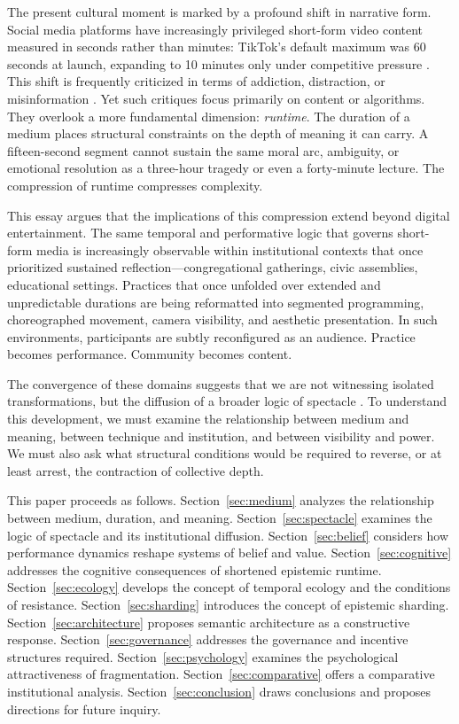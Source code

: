\documentclass[12pt]{article}
\begin{document}
The present cultural moment is marked by a profound shift in narrative form. Social media platforms have increasingly privileged short-form video content measured in seconds rather than minutes: TikTok's default maximum was 60 seconds at launch, expanding to 10 minutes only under competitive pressure \citep{Herrman2019}. This shift is frequently criticized in terms of addiction, distraction, or misinformation \citep{Twenge2017,Haidt2023}. Yet such critiques focus primarily on content or algorithms. They overlook a more fundamental dimension: \emph{runtime}. The duration of a medium places structural constraints on the depth of meaning it can carry. A fifteen-second segment cannot sustain the same moral arc, ambiguity, or emotional resolution as a three-hour tragedy or even a forty-minute lecture. The compression of runtime compresses complexity.

This essay argues that the implications of this compression extend beyond digital entertainment. The same temporal and performative logic that governs short-form media is increasingly observable within institutional contexts that once prioritized sustained reflection---congregational gatherings, civic assemblies, educational settings. Practices that once unfolded over extended and unpredictable durations are being reformatted into segmented programming, choreographed movement, camera visibility, and aesthetic presentation. In such environments, participants are subtly reconfigured as an audience. Practice becomes performance. Community becomes content.

The convergence of these domains suggests that we are not witnessing isolated transformations, but the diffusion of a broader logic of spectacle \citep{Debord1994}. To understand this development, we must examine the relationship between medium and meaning, between technique and institution, and between visibility and power. We must also ask what structural conditions would be required to reverse, or at least arrest, the contraction of collective depth.

This paper proceeds as follows. Section~\ref{sec:medium} analyzes the relationship between medium, duration, and meaning. Section~\ref{sec:spectacle} examines the logic of spectacle and its institutional diffusion. Section~\ref{sec:belief} considers how performance dynamics reshape systems of belief and value. Section~\ref{sec:cognitive} addresses the cognitive consequences of shortened epistemic runtime. Section~\ref{sec:ecology} develops the concept of temporal ecology and the conditions of resistance. Section~\ref{sec:sharding} introduces the concept of epistemic sharding. Section~\ref{sec:architecture} proposes semantic architecture as a constructive response. Section~\ref{sec:governance} addresses the governance and incentive structures required. Section~\ref{sec:psychology} examines the psychological attractiveness of fragmentation. Section~\ref{sec:comparative} offers a comparative institutional analysis. Section~\ref{sec:conclusion} draws conclusions and proposes directions for future inquiry.
\end{document}
